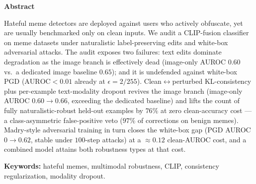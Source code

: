 \documentclass{article}
\renewenvironment{abstract}{%
  \centerline{\large\bf Abstract}%
  \vspace{-0.12in}%
  \list{}{\setlength{\leftmargin}{1.2em}\setlength{\rightmargin}{\leftmargin}}%
  \item\relax}%
  {\endlist\vskip 0.12in}
\begin{document}
\nocite{IEEEexample:BSTcontrol}


\printAffiliationsAndNotice{}

\begin{abstract}
Hateful meme detectors are deployed against users who actively obfuscate, yet are usually benchmarked only on clean inputs. We audit a
CLIP-fusion classifier on meme datasets under naturalistic
label-preserving edits and white-box adversarial attacks. The
audit exposes two failures: text edits dominate degradation as the image branch is
effectively dead (image-only AUROC $0.60$ vs.\ a dedicated image baseline
$0.65$); and it is undefended against
white-box PGD ($\mathrm{AUROC}<0.01$ already at $\epsilon{=}2/255$). Clean$\leftrightarrow$perturbed KL-consistency
plus per-example text-modality dropout revives the image branch (image-only
AUROC $0.60\!\rightarrow\!0.66$, exceeding the dedicated baseline) and lifts the
count of fully naturalistic-robust held-out examples by $76\%$ at zero
clean-accuracy cost --- a class-asymmetric false-positive veto ($97\%$ of
corrections on benign memes). Madry-style adversarial training in turn closes the
white-box gap (PGD AUROC $0\!\rightarrow\!0.62$, stable under $100$-step attacks)
at a $\approx\!0.12$ clean-AUROC cost, and a combined model attains both
robustness types at that cost.

\textbf{Keywords:} hateful memes, multimodal robustness, CLIP, consistency regularization, modality dropout.

\end{abstract}
\end{document}
